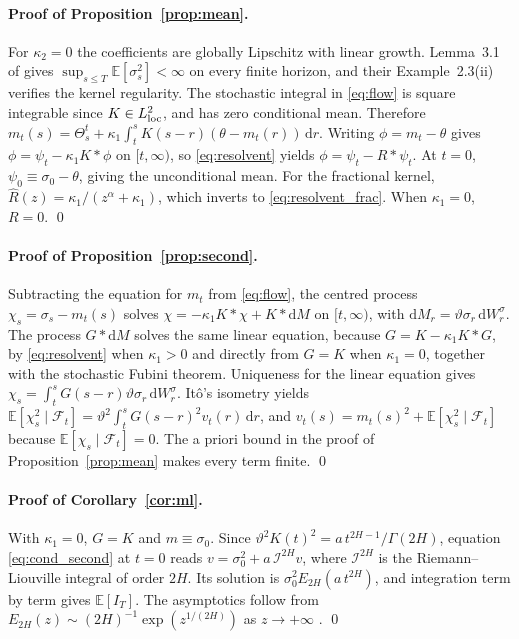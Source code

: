 \documentclass[11pt,a4paper]{article}
\theoremstyle{definition}
\newcommand{\D}{\mathrm{d}}
\newcommand{\E}{\mathbb{E}}
\newcommand{\F}{\mathcal{F}}
\begin{document}
\paragraph{Proof of Proposition~\ref{prop:mean}.} For $\kappa_2=0$ the coefficients are globally Lipschitz with linear growth. Lemma~3.1 of \citet{AbiJaberLarssonPulido2019} gives $\sup_{s\le T}\E[\sigma_s^2]<\infty$ on every finite horizon, and their Example~2.3(ii) verifies the kernel regularity. The stochastic integral in \eqref{eq:flow} is square integrable since $K\in L^2_{\rm loc}$, and has zero conditional mean. Therefore $m_t(s)=\Theta^t_s+\kappa_1\int_t^sK(s-r)(\theta-m_t(r))\,\D r$. Writing $\phi=m_t-\theta$ gives $\phi=\psi_t-\kappa_1K*\phi$ on $[t,\infty)$, so \eqref{eq:resolvent} yields $\phi=\psi_t-R*\psi_t$. At $t=0$, $\psi_0\equiv\sigma_0-\theta$, giving the unconditional mean. For the fractional kernel, $\widehat R(z)=\kappa_1/(z^\alpha+\kappa_1)$, which inverts to \eqref{eq:resolvent_frac}. When $\kappa_1=0$, $R=0$. \qed

\paragraph{Proof of Proposition~\ref{prop:second}.} Subtracting the equation for $m_t$ from \eqref{eq:flow}, the centred process $\chi_s=\sigma_s-m_t(s)$ solves $\chi=-\kappa_1K*\chi+K*\D M$ on $[t,\infty)$, with $\D M_r=\vartheta\sigma_r\,\D W^\sigma_r$. The process $G*\D M$ solves the same linear equation, because $G=K-\kappa_1K*G$, by \eqref{eq:resolvent} when $\kappa_1>0$ and directly from $G=K$ when $\kappa_1=0$, together with the stochastic Fubini theorem. Uniqueness for the linear equation gives $\chi_s=\int_t^sG(s-r)\vartheta\sigma_r\,\D W^\sigma_r$. It\^o's isometry yields $\E[\chi_s^2\mid\F_t]=\vartheta^2\int_t^sG(s-r)^2v_t(r)\,\D r$, and $v_t(s)=m_t(s)^2+\E[\chi_s^2\mid\F_t]$ because $\E[\chi_s\mid\F_t]=0$. The a priori bound in the proof of Proposition~\ref{prop:mean} makes every term finite. \qed

\paragraph{Proof of Corollary~\ref{cor:ml}.} With $\kappa_1=0$, $G=K$ and $m\equiv\sigma_0$. Since $\vartheta^2K(t)^2=a\,t^{2H-1}/\Gamma(2H)$, equation \eqref{eq:cond_second} at $t=0$ reads $v=\sigma_0^2+a\,\mathcal{I}^{2H}v$, where $\mathcal{I}^{2H}$ is the Riemann--Liouville integral of order $2H$. Its solution is $\sigma_0^2E_{2H}(a\,t^{2H})$, and integration term by term gives $\E[I_T]$. The asymptotics follow from $E_{2H}(z)\sim(2H)^{-1}\exp(z^{1/(2H)})$ as $z\to+\infty$ \citep{GorenfloKilbasMainardiRogosin2014}. \qed
\end{document}
